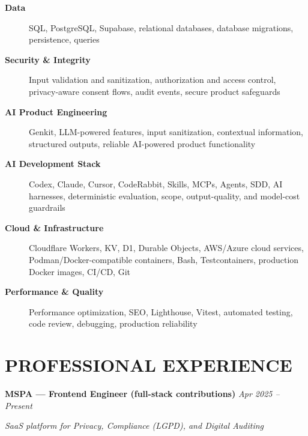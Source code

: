 \documentclass[10pt,a4paper]{article}
\begin{document}
\begin{description}
    \item[\textbf{Data}]
    SQL, PostgreSQL, Supabase, relational databases,
    database migrations, persistence, queries

    \item[\textbf{Security \& Integrity}]
    Input validation and sanitization, authorization and access control,
    privacy-aware consent flows, audit events, secure product safeguards

    \item[\textbf{AI Product Engineering}]
    Genkit, LLM-powered features, input sanitization,
    contextual information, structured outputs,
    reliable AI-powered product functionality

    \item[\textbf{AI Development Stack}]
    Codex, Claude, Cursor, CodeRabbit, Skills, MCPs,
    Agents, SDD, AI harnesses, deterministic evaluation,
    scope, output-quality, and model-cost guardrails

    \item[\textbf{Cloud \& Infrastructure}]
    Cloudflare Workers, KV, D1, Durable Objects,
    AWS/Azure cloud services, Podman/Docker-compatible containers,
    Bash, Testcontainers, production Docker images, CI/CD, Git

    \item[\textbf{Performance \& Quality}]
    Performance optimization, SEO, Lighthouse,
    Vitest, automated testing, code review,
    debugging, production reliability

\end{description}


\section*{PROFESSIONAL EXPERIENCE}

\noindent
\textbf{MSPA — Frontend Engineer (full-stack contributions)}
\hfill
\textit{Apr 2025 -- Present}

\textit{SaaS platform for Privacy, Compliance (LGPD), and Digital Auditing}
\end{document}

